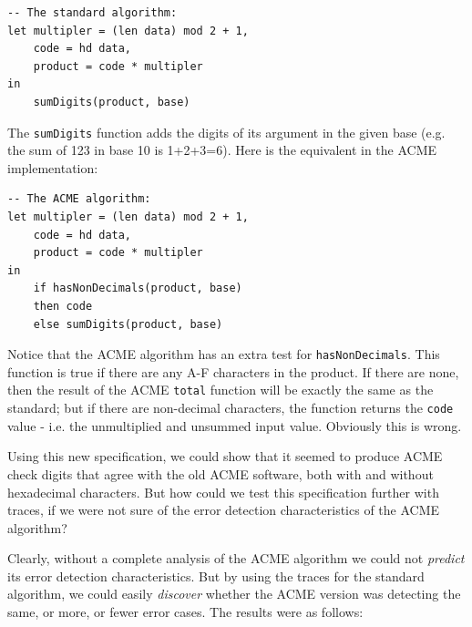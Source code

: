 \documentclass{overturerepchap}
\begin{document}
\small
\begin{lstlisting}
-- The standard algorithm:
let multipler = (len data) mod 2 + 1,
    code = hd data,
    product = code * multipler
in
    sumDigits(product, base)
\end{lstlisting}
\normalsize

\noindent The \texttt{sumDigits} function adds the digits of its argument in the
given base (e.g. the sum of 123 in base 10 is 1+2+3=6). Here is the equivalent
in the ACME implementation:

\small
\begin{lstlisting}
-- The ACME algorithm:
let multipler = (len data) mod 2 + 1,
    code = hd data,
    product = code * multipler
in
    if hasNonDecimals(product, base)
    then code
    else sumDigits(product, base)
\end{lstlisting}
\normalsize

\noindent Notice that the ACME algorithm has an extra test for
\texttt{hasNonDecimals}. This function is true if there are any A-F characters
in the product. If there are none, then the result of the ACME \texttt{total}
function will be exactly the same as the standard; but if there are non-decimal
characters, the function returns the \texttt{code} value - i.e. the
unmultiplied and unsummed input value. Obviously this is wrong.

Using this new specification, we could show that it seemed to produce ACME
check digits that agree with the old ACME software, both with and without
hexadecimal characters. But how could we test this specification further with
traces, if we were not sure of the error detection characteristics of the ACME
algorithm?

Clearly, without a complete analysis of the ACME algorithm we could not
\emph{predict} its error detection characteristics. But by using the traces for
the standard algorithm, we could easily \emph{discover} whether the ACME
version was detecting the same, or more, or fewer error cases. The results were
as follows:
\end{document}
